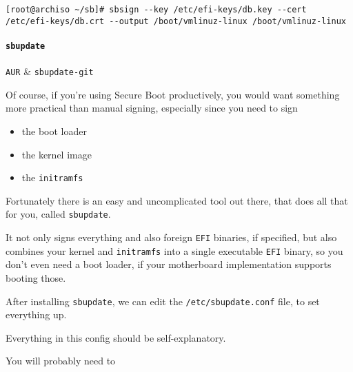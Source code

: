 \documentclass[10pt]{dustdoc}
\begin{document}
\begin{verbatim}
[root@archiso ~/sb]# sbsign --key /etc/efi-keys/db.key --cert /etc/efi-keys/db.crt --output /boot/vmlinuz-linux /boot/vmlinuz-linux
\end{verbatim}

\paragraph{\texttt{sbupdate}}
\label{par:sbupdate}

\begin{packagetable}
    \texttt{AUR} & \texttt{sbupdate-git} \\
\end{packagetable}

Of course, if you’re using Secure Boot productively, you would want something more practical than manual signing, especially since you need to sign

\begin{itemize}
    \item the boot loader

    \item the kernel image

    \item the \texttt{initramfs}
\end{itemize}

Fortunately there is an easy and uncomplicated tool out there, that does all that for you, called \texttt{sbupdate}.

It not only signs everything and also foreign \texttt{EFI} binaries, if specified, but also combines your kernel and \texttt{initramfs} into a single executable \texttt{EFI} binary, so you don’t even need a boot loader, if your motherboard implementation supports booting those.

After installing \texttt{sbupdate}, we can edit the \texttt{/etc/sbupdate.conf} file, to set everything up.

Everything in this config should be self-explanatory.

You will probably need to
\end{document}
